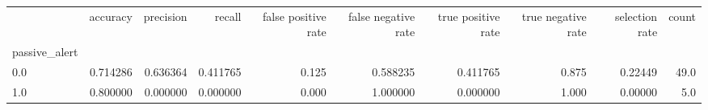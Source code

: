 \begin{tabular}{lrrrrrrrrr}
\toprule
{} &  accuracy &  precision &    recall &  false positive rate &  false negative rate &  true positive rate &  true negative rate &  selection rate &  count \\
passive\_alert &           &            &           &                      &                      &                     &                     &                 &        \\
\midrule
0.0           &  0.714286 &   0.636364 &  0.411765 &                0.125 &             0.588235 &            0.411765 &               0.875 &         0.22449 &   49.0 \\
1.0           &  0.800000 &   0.000000 &  0.000000 &                0.000 &             1.000000 &            0.000000 &               1.000 &         0.00000 &    5.0 \\
\bottomrule
\end{tabular}
